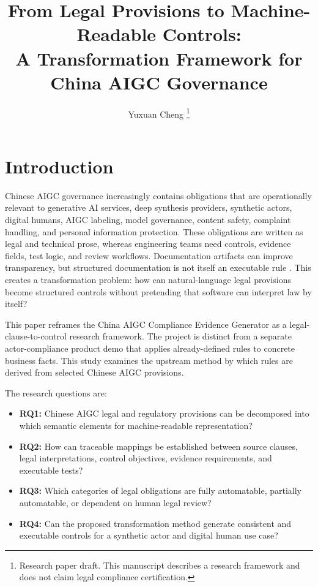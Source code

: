 \documentclass[10pt,journal]{IEEEtran}
\title{From Legal Provisions to Machine-Readable Controls:\\
A Transformation Framework for China AIGC Governance}
\author{Yuxuan Cheng%
\thanks{Research paper draft. This manuscript describes a research framework and does not claim legal compliance certification.}}
\begin{document}
\maketitle
\IEEEdisplaynontitleabstractindextext
\IEEEpeerreviewmaketitle

\section{Introduction}

Chinese AIGC governance increasingly contains obligations that are operationally relevant to generative AI services, deep synthesis providers, synthetic actors, digital humans, AIGC labeling, model governance, content safety, complaint handling, and personal information protection. These obligations are written as legal and technical prose, whereas engineering teams need controls, evidence fields, test logic, and review workflows. Documentation artifacts can improve transparency, but structured documentation is not itself an executable rule \cite{mitchell2019model,gebru2021datasheets}. This creates a transformation problem: how can natural-language legal provisions become structured controls without pretending that software can interpret law by itself?

This paper reframes the China AIGC Compliance Evidence Generator as a legal-clause-to-control research framework. The project is distinct from a separate actor-compliance product demo that applies already-defined rules to concrete business facts. This study examines the upstream method by which rules are derived from selected Chinese AIGC provisions.

The research questions are:

\begin{itemize}
  \item \textbf{RQ1:} Chinese AIGC legal and regulatory provisions can be decomposed into which semantic elements for machine-readable representation?
  \item \textbf{RQ2:} How can traceable mappings be established between source clauses, legal interpretations, control objectives, evidence requirements, and executable tests?
  \item \textbf{RQ3:} Which categories of legal obligations are fully automatable, partially automatable, or dependent on human legal review?
  \item \textbf{RQ4:} Can the proposed transformation method generate consistent and executable controls for a synthetic actor and digital human use case?
\end{itemize}
\end{document}
